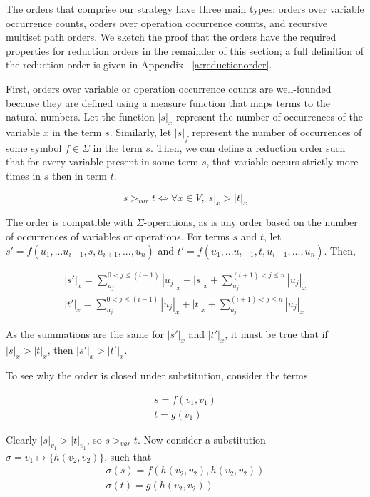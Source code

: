\documentclass[sigplan,10pt,review,anonymous]{acmart}\settopmatter{printfolios=true,printccs=false,printacmref=false}
\begin{document}
The orders that comprise our strategy have three main types: orders over variable
occurrence counts, orders over operation occurrence counts, and recursive
multiset path orders. We sketch the proof that the orders have the required
properties for reduction orders in the remainder of this section; a full
definition of the reduction order is given in Appendix ~\ref{a:reductionorder}.

First, orders over variable or operation occurrence counts are well-founded 
because they are defined using a measure function that maps terms to the natural
numbers. Let the function $|s|_x$ represent the number of occurrences of the
variable $x$ in the term $s$. Similarly, let $|s|_f$ represent the number of
occurrences of some symbol $f \in \Sigma$ in the term $s$. Then, we can define a reduction order such that for every variable present in some term $s$, that variable occurs strictly more times in $s$ then in term $t$.

\begin{equation*}
s >_{var} t \iff \forall x \in V, |s|_x > |t|_x
\end{equation*}

The order is compatible with $\Sigma$-operations, as is any order based on the number of occurrences of variables or operations. For terms $s$ and $t$, let $s' = f(u_1,...u_{i-1},s,u_{i+1},...,u_n)$ and $t' = f(u_1,...u_{i-1},t,u_{i+1},...,u_n)$. Then, 

\begin{gather*}
|s'|_x = \sum_{u_j}^{0<j \leq (i-1)} |u_j|_x + |s|_x + \sum_{u_j}^{(i+1)<j \leq n} |u_j|_x \\
|t'|_x = \sum_{u_j}^{0<j \leq (i-1)} |u_j|_x + |t|_x + \sum_{u_j}^{(i+1)<j \leq n} |u_j|_x
\end{gather*}

As the summations are the same for $|s'|_x$ and $|t'|_x$, it must be true that if $|s|_x > |t|_x$, then $|s'|_x > |t'|_x$.

To see why the order is closed under substitution, consider the terms 

\begin{gather*}
s = f(v_1,v_1) \\
 t = g(v_1)
\end{gather*}

 Clearly $|s|_{v_1} > |t|_{v_1}$, so $s >_{var} t$. Now consider a substitution $\sigma = v_1 \mapsto \{h(v_2,v_2)\}$, such that 
\begin{gather*}
\sigma(s) = f(h(v_2,v_2),h(v_2,v_2)) \\
 \sigma(t) = g(h(v_2,v_2))
\end{gather*}
\end{document}
